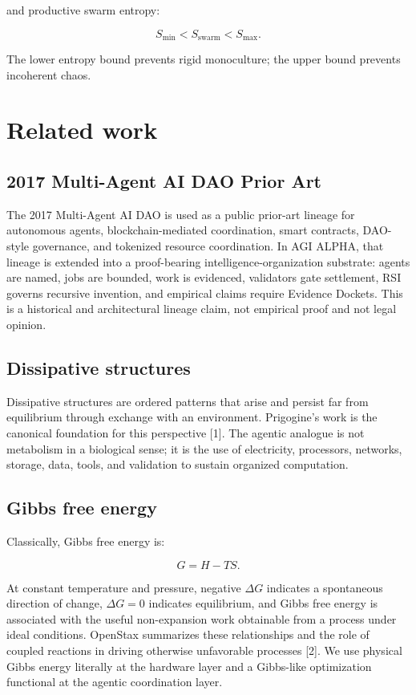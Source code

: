 and productive swarm entropy:

\[
S_{\min}<S_{\text{swarm}}<S_{\max}.
\]

The lower entropy bound prevents rigid monoculture; the upper bound
prevents incoherent chaos.

\section{Related work}\label{related-work}

\subsection{2017 Multi-Agent AI DAO Prior
Art}\label{multi-agent-ai-dao-prior-art}

The 2017 Multi-Agent AI DAO is used as a public prior-art lineage for
autonomous agents, blockchain-mediated coordination, smart contracts,
DAO-style governance, and tokenized resource coordination. In AGI ALPHA,
that lineage is extended into a proof-bearing intelligence-organization
substrate: agents are named, jobs are bounded, work is evidenced,
validators gate settlement, RSI governs recursive invention, and
empirical claims require Evidence Dockets. This is a historical and
architectural lineage claim, not empirical proof and not legal opinion.

\subsection{Dissipative structures}\label{dissipative-structures}

Dissipative structures are ordered patterns that arise and persist far
from equilibrium through exchange with an environment. Prigogine's work
is the canonical foundation for this perspective {[}1{]}. The agentic
analogue is not metabolism in a biological sense; it is the use of
electricity, processors, networks, storage, data, tools, and validation
to sustain organized computation.

\subsection{Gibbs free energy}\label{gibbs-free-energy}

Classically, Gibbs free energy is:

\[
G=H-TS.
\]

At constant temperature and pressure, negative \(\Delta G\) indicates a
spontaneous direction of change, \(\Delta G=0\) indicates equilibrium,
and Gibbs free energy is associated with the useful non-expansion work
obtainable from a process under ideal conditions. OpenStax summarizes
these relationships and the role of coupled reactions in driving
otherwise unfavorable processes {[}2{]}. We use physical Gibbs energy
literally at the hardware layer and a Gibbs-like optimization functional
at the agentic coordination layer.

